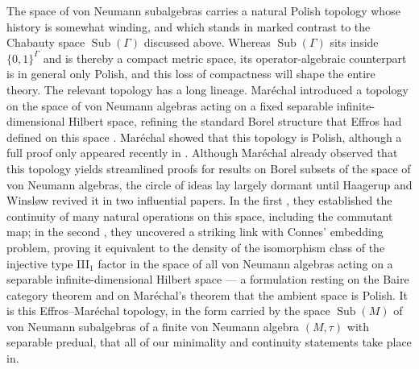 \documentclass[12pt]{amsart} %
\theoremstyle{plain}
\theoremstyle{definition}
\DeclareMathOperator{\Sub}{Sub}
\begin{document}
The space of von Neumann subalgebras carries a natural Polish topology whose
history is somewhat winding, and which stands in marked contrast to the
Chabauty space $\Sub(\Gamma)$ discussed above. Whereas $\Sub(\Gamma)$ sits
inside $\{0,1\}^\Gamma$ and is thereby a compact metric space, its operator-algebraic counterpart is in general only Polish, and this loss of compactness will shape the entire theory. The relevant topology has a long
lineage. Mar\'echal \cite{Marechal1973}
introduced a topology on the space of von Neumann algebras acting on a
fixed separable infinite-dimensional Hilbert space, refining the standard Borel
structure that Effros had defined on this space \cite{Effros1965}. Maréchal showed that this topology is Polish, although a
full proof only appeared recently in \cite{fima2024michael}.
Although Mar\'echal already observed that this topology yields streamlined
proofs for results on Borel subsets of the space of von Neumann algebras, the
circle of ideas lay largely dormant until Haagerup and Winsl\o w revived it in
two influential papers. In the first \cite{haagerup1998effros}, they established the
continuity of many natural operations on this space, including the commutant
map; in the second \cite{HW2000}, they uncovered a striking link with Connes'
embedding problem, proving it equivalent to the density of the isomorphism
class of the injective type III$_1$ factor in the space of all von Neumann
algebras acting on a separable infinite-dimensional Hilbert space --- a
formulation resting on the Baire category theorem and on Mar\'echal's theorem
that the ambient space is Polish. It is this Effros--Mar\'echal topology, in the
form carried by the space $\Sub(M)$ of von Neumann subalgebras of a finite von
Neumann algebra $(M,\tau)$ with separable predual, that all of our minimality
and continuity statements take place in.
\end{document}
